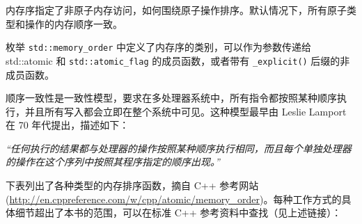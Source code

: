 内存序指定了非原子内存访问，如何围绕原子操作排序。默认情况下，所有原子类型和操作的内存顺序一致。

枚举 \verb|std::memory_order| 中定义了内存序的类别，可以作为参数传递给 std::atomic 和 \verb|std::atomic_flag| 的成员函数，或者带有 \verb|_explicit()| 后缀的非成员函数。

\begin{myNotic}
顺序一致性是一致性模型，要求在多处理器系统中，所有指令都按照某种顺序执行，并且所有写入都会立即在整个系统中可见。这种模型最早由 Leslie Lamport 在 70 年代提出，描述如下：

\textit{“任何执行的结果都与处理器的操作按照某种顺序执行相同，而且每个单独处理器的操作在这个序列中按照其程序指定的顺序出现。”}
\end{myNotic}

下表列出了各种类型的内存排序函数，摘自 C++ 参考网站 (\url{http://en.cppreference.com/w/cpp/atomic/memory_order})。每种工作方式的具体细节超出了本书的范围，可以在标准 C++ 参考资料中查找（见上述链接）：

